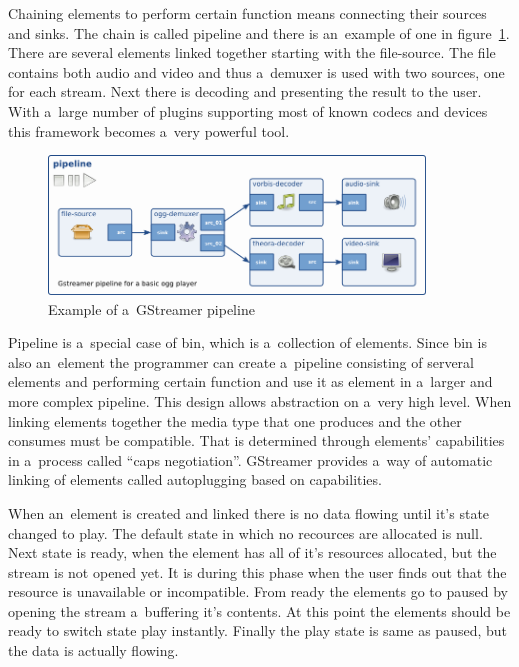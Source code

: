 Chaining elements to perform certain function means connecting their sources and sinks. The chain is called pipeline and there is an~example of one in figure~\ref{fig:gstreamerPipeline}. There are several elements linked together starting with the file-source. The file contains both audio and video and thus a~demuxer is used with two sources, one for each stream. Next there is decoding and presenting the result to the user. With a~large number of plugins supporting most of known codecs and devices this framework becomes a~very powerful tool. 

\begin{figure}[ht]
	\begin{center}
	\includegraphics[width=10cm]{fig/gstreamer-pipeline.png}
	\caption{Example of a~GStreamer pipeline}
	\label{fig:gstreamerPipeline}
\end{center}
\end{figure}

Pipeline is a~special case of bin, which is a~collection of elements. Since bin is also an~element the programmer can create a~pipeline consisting of serveral elements and performing certain function and use it as element in a~larger and more complex pipeline. This design allows abstraction on a~very high level. When linking elements together the media type that one produces and the other consumes must be compatible. That is determined through elements' capabilities in a~process called ``caps negotiation''. GStreamer provides a~way of automatic linking of elements called autoplugging based on capabilities. 

When an~element is created and linked there is no data flowing until it's state changed to play. The default state in which no recources are allocated is null. Next state is ready, when the element has all of it's resources allocated, but the stream is not opened yet. It is during this phase when the user finds out that the resource is unavailable or incompatible. From ready the elements go to paused by opening the stream a~buffering it's contents. At this point the elements should be ready to switch state play instantly. Finally the play state is same as paused, but the data is actually flowing. 

